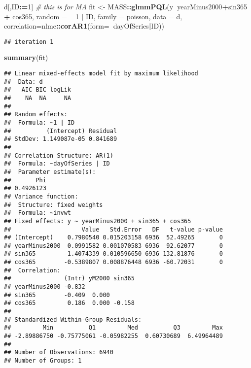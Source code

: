 \documentclass[]{book}
\newenvironment{Shaded}{\begin{snugshade}}{\end{snugshade}}
\newcommand{\KeywordTok}[1]{\textcolor[rgb]{0.13,0.29,0.53}{\textbf{#1}}}
\newcommand{\DataTypeTok}[1]{\textcolor[rgb]{0.13,0.29,0.53}{#1}}
\newcommand{\DecValTok}[1]{\textcolor[rgb]{0.00,0.00,0.81}{#1}}
\newcommand{\StringTok}[1]{\textcolor[rgb]{0.31,0.60,0.02}{#1}}
\newcommand{\CommentTok}[1]{\textcolor[rgb]{0.56,0.35,0.01}{\textit{#1}}}
\newcommand{\OperatorTok}[1]{\textcolor[rgb]{0.81,0.36,0.00}{\textbf{#1}}}
\newcommand{\ErrorTok}[1]{\textcolor[rgb]{0.64,0.00,0.00}{\textbf{#1}}}
\newcommand{\NormalTok}[1]{#1}
\begin{document}
\begin{Shaded}
\begin{Highlighting}[]
\NormalTok{d[,ID}\OperatorTok{:}\ErrorTok{=}\DecValTok{1}\NormalTok{]}
\CommentTok{# this is for MA}
\NormalTok{fit <-}\StringTok{ }\NormalTok{MASS}\OperatorTok{::}\KeywordTok{glmmPQL}\NormalTok{(y}\OperatorTok{~}\NormalTok{yearMinus2000}\OperatorTok{+}\NormalTok{sin365 }\OperatorTok{+}\StringTok{ }\NormalTok{cos365, }\DataTypeTok{random =} \OperatorTok{~}\StringTok{ }\DecValTok{1} \OperatorTok{|}\StringTok{ }\NormalTok{ID,}
                \DataTypeTok{family =}\NormalTok{ poisson, }\DataTypeTok{data =}\NormalTok{ d,}
                \DataTypeTok{correlation=}\NormalTok{nlme}\OperatorTok{::}\KeywordTok{corAR1}\NormalTok{(}\DataTypeTok{form=}\OperatorTok{~}\NormalTok{dayOfSeries}\OperatorTok{|}\NormalTok{ID))}
\end{Highlighting}
\end{Shaded}

\begin{verbatim}
## iteration 1
\end{verbatim}

\begin{Shaded}
\begin{Highlighting}[]
\KeywordTok{summary}\NormalTok{(fit)}
\end{Highlighting}
\end{Shaded}

\begin{verbatim}
## Linear mixed-effects model fit by maximum likelihood
##  Data: d 
##   AIC BIC logLik
##    NA  NA     NA
## 
## Random effects:
##  Formula: ~1 | ID
##          (Intercept) Residual
## StdDev: 1.149087e-05 0.841689
## 
## Correlation Structure: AR(1)
##  Formula: ~dayOfSeries | ID 
##  Parameter estimate(s):
##       Phi 
## 0.4926123 
## Variance function:
##  Structure: fixed weights
##  Formula: ~invwt 
## Fixed effects: y ~ yearMinus2000 + sin365 + cos365 
##                    Value   Std.Error   DF   t-value p-value
## (Intercept)    0.7980540 0.015203158 6936  52.49265       0
## yearMinus2000  0.0991582 0.001070583 6936  92.62077       0
## sin365         1.4074339 0.010596650 6936 132.81876       0
## cos365        -0.5389807 0.008876448 6936 -60.72031       0
##  Correlation: 
##               (Intr) yM2000 sin365
## yearMinus2000 -0.832              
## sin365        -0.409  0.000       
## cos365         0.186  0.000 -0.158
## 
## Standardized Within-Group Residuals:
##         Min          Q1         Med          Q3         Max 
## -2.89886750 -0.75775061 -0.05982255  0.60730689  6.49964489 
## 
## Number of Observations: 6940
## Number of Groups: 1
\end{verbatim}
\end{document}
